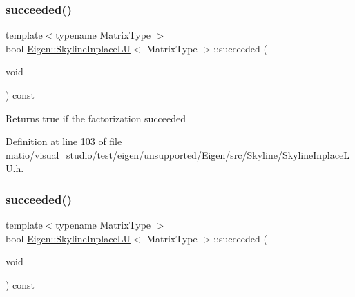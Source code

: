 \subsubsection{\texorpdfstring{succeeded()}{succeeded()}\hspace{0.1cm}{\footnotesize\ttfamily [1/2]}}
{\footnotesize\ttfamily template$<$typename Matrix\+Type $>$ \\
bool \hyperlink{class_eigen_1_1_skyline_inplace_l_u}{Eigen\+::\+Skyline\+Inplace\+LU}$<$ Matrix\+Type $>$\+::succeeded (\begin{DoxyParamCaption}\item[{void}]{ }\end{DoxyParamCaption}) const\hspace{0.3cm}{\ttfamily [inline]}}

\begin{DoxyReturn}{Returns}
true if the factorization succeeded 
\end{DoxyReturn}


Definition at line \hyperlink{matio_2visual__studio_2test_2eigen_2unsupported_2_eigen_2src_2_skyline_2_skyline_inplace_l_u_8h_source_l00103}{103} of file \hyperlink{matio_2visual__studio_2test_2eigen_2unsupported_2_eigen_2src_2_skyline_2_skyline_inplace_l_u_8h_source}{matio/visual\+\_\+studio/test/eigen/unsupported/\+Eigen/src/\+Skyline/\+Skyline\+Inplace\+L\+U.\+h}.

\mbox{\label{class_eigen_1_1_skyline_inplace_l_u_abd633c27a0a342fb392b6af3ceb800ba}} 
\subsubsection{\texorpdfstring{succeeded()}{succeeded()}\hspace{0.1cm}{\footnotesize\ttfamily [2/2]}}
{\footnotesize\ttfamily template$<$typename Matrix\+Type $>$ \\
bool \hyperlink{class_eigen_1_1_skyline_inplace_l_u}{Eigen\+::\+Skyline\+Inplace\+LU}$<$ Matrix\+Type $>$\+::succeeded (\begin{DoxyParamCaption}\item[{void}]{ }\end{DoxyParamCaption}) const\hspace{0.3cm}{\ttfamily [inline]}}

